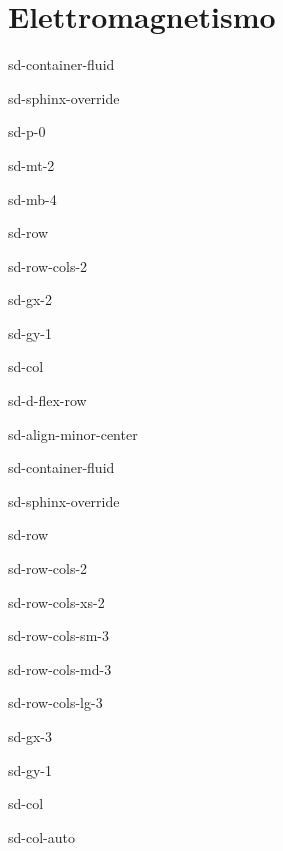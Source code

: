 \documentclass[letterpaper,10pt,english]{jupyterBook}
\begin{document}
\sphinxAtStartPar
{}

\sphinxAtStartPar
{\hyperref[\detokenize{ch/optics:classical-electromagnetism-optics}]{}}

\sphinxAtStartPar
{}  

\sphinxstepscope


\part{Elettromagnetismo}

\sphinxstepscope

\begin{sphinxuseclass}{sd-container-fluid}
\begin{sphinxuseclass}{sd-sphinx-override}
\begin{sphinxuseclass}{sd-p-0}
\begin{sphinxuseclass}{sd-mt-2}
\begin{sphinxuseclass}{sd-mb-4}
\begin{sphinxuseclass}{sd-row}
\begin{sphinxuseclass}{sd-row-cols-2}
\begin{sphinxuseclass}{sd-gx-2}
\begin{sphinxuseclass}{sd-gy-1}
\begin{sphinxuseclass}{sd-col}
\begin{sphinxuseclass}{sd-d-flex-row}
\begin{sphinxuseclass}{sd-align-minor-center}
\begin{sphinxuseclass}{sd-container-fluid}
\begin{sphinxuseclass}{sd-sphinx-override}
\begin{sphinxuseclass}{sd-row}
\begin{sphinxuseclass}{sd-row-cols-2}
\begin{sphinxuseclass}{sd-row-cols-xs-2}
\begin{sphinxuseclass}{sd-row-cols-sm-3}
\begin{sphinxuseclass}{sd-row-cols-md-3}
\begin{sphinxuseclass}{sd-row-cols-lg-3}
\begin{sphinxuseclass}{sd-gx-3}
\begin{sphinxuseclass}{sd-gy-1}
\begin{sphinxuseclass}{sd-col}
\begin{sphinxuseclass}{sd-col-auto}

\end{sphinxuseclass}
\end{sphinxuseclass}
\end{sphinxuseclass}
\end{sphinxuseclass}
\end{sphinxuseclass}
\end{sphinxuseclass}
\end{sphinxuseclass}
\end{sphinxuseclass}
\end{sphinxuseclass}
\end{sphinxuseclass}
\end{sphinxuseclass}
\end{sphinxuseclass}
\end{sphinxuseclass}
\end{sphinxuseclass}
\end{sphinxuseclass}
\end{sphinxuseclass}
\end{sphinxuseclass}
\end{sphinxuseclass}
\end{sphinxuseclass}
\end{sphinxuseclass}
\end{sphinxuseclass}
\end{sphinxuseclass}
\end{sphinxuseclass}
\end{sphinxuseclass}
\end{document}

